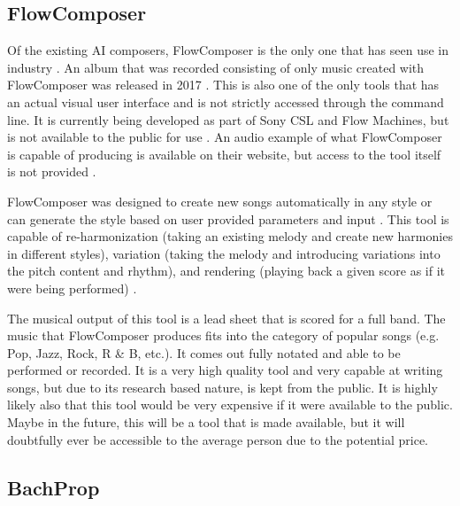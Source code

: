 \subsection{FlowComposer}
\label{subsec:flowcomposer}

Of the existing AI composers, FlowComposer is the only one that has seen use in industry \cite{Papadopoulos_2016}.  An album that was recorded consisting of only music created with FlowComposer was released in 2017 \cite{Papadopoulos_2016}.  This is also one of the only tools that has an actual visual user interface and is not strictly accessed through the command line.  It is currently being developed as part of Sony CSL and Flow Machines, but is not available to the public for use \cite{Papadopoulos_2016}.  An audio example of what FlowComposer is capable of producing is available on their website, but access to the tool itself is not provided \cite{Flow_2018}.

\vspace{\baselineskip}

FlowComposer was designed to create new songs automatically in any style or can generate the style based on user provided parameters and input \cite{Papadopoulos_2016}.  This tool is capable of re-harmonization (taking an existing melody and create new harmonies in different styles), variation (taking the melody and introducing variations into the pitch content and rhythm), and rendering (playing back a given score as if it were being performed) \cite{Flow_2018}.

\vspace{\baselineskip}

The musical output of this tool is a lead sheet that is scored for a full band.  The music that FlowComposer produces fits into the category of popular songs (e.g. Pop, Jazz, Rock, R \& B, etc.).  It comes out fully notated and able to be performed or recorded.  It is a very high quality tool and very capable at writing songs, but due to its research based nature, is kept from the public.  It is highly likely also that this tool would be very expensive if it were available to the public.  Maybe in the future, this will be a tool that is made available, but it will doubtfully ever be accessible to the average person due to the potential price.

\subsection{BachProp}
\label{subsec:bachprop}

